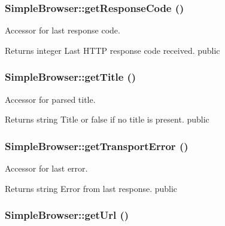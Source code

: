 \hypertarget{class_simple_browser_acad2d21725cfa0c655104f8e83564c43}{
\subsubsection[{getResponseCode}]{\setlength{\rightskip}{0pt plus 5cm}SimpleBrowser::getResponseCode ()}}
\label{class_simple_browser_acad2d21725cfa0c655104f8e83564c43}
Accessor for last response code. \begin{DoxyReturn}{Returns}
integer Last HTTP response code received.  public 
\end{DoxyReturn}
\hypertarget{class_simple_browser_a633faed2b21e33e9351f41518285b964}{
\subsubsection[{getTitle}]{\setlength{\rightskip}{0pt plus 5cm}SimpleBrowser::getTitle ()}}
\label{class_simple_browser_a633faed2b21e33e9351f41518285b964}
Accessor for parsed title. \begin{DoxyReturn}{Returns}
string Title or false if no title is present.  public 
\end{DoxyReturn}
\hypertarget{class_simple_browser_aa2141efbbde157cd02e747a149c729db}{
\subsubsection[{getTransportError}]{\setlength{\rightskip}{0pt plus 5cm}SimpleBrowser::getTransportError ()}}
\label{class_simple_browser_aa2141efbbde157cd02e747a149c729db}
Accessor for last error. \begin{DoxyReturn}{Returns}
string Error from last response.  public 
\end{DoxyReturn}
\hypertarget{class_simple_browser_a92cdd5a8dc1a7b29ca064bb3f29ad63d}{
\subsubsection[{getUrl}]{\setlength{\rightskip}{0pt plus 5cm}SimpleBrowser::getUrl ()}}
